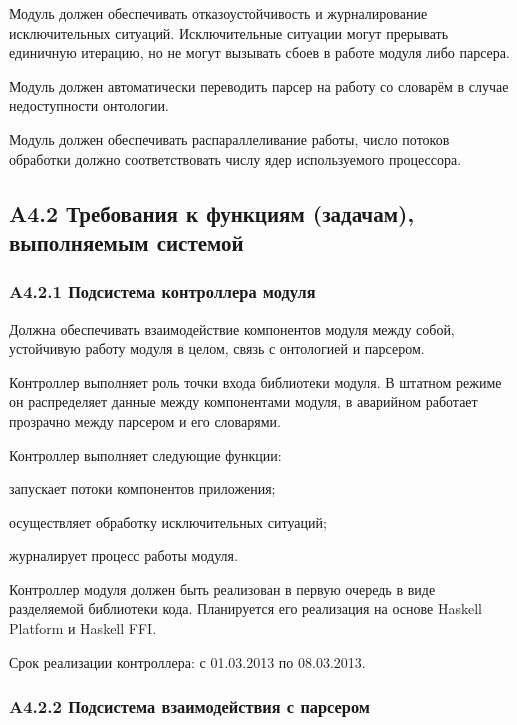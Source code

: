 Модуль должен обеспечивать отказоустойчивость и журналирование исключительных ситуаций. Исключительные ситуации могут прерывать единичную итерацию, но не могут вызывать сбоев в работе модуля либо парсера.

Модуль должен автоматически переводить парсер на работу со словарём в случае недоступности онтологии.

Модуль должен обеспечивать распараллеливание работы, число потоков обработки должно соответствовать числу ядер используемого процессора.

\subsection*{A4.2 Требования к функциям (задачам), выполняемым системой}

\subsubsection*{A4.2.1 Подсистема контроллера модуля}

Должна обеспечивать взаимодействие компонентов модуля между собой, устойчивую
работу модуля в целом, связь с онтологией и парсером.

Контроллер выполняет роль точки входа библиотеки модуля. В штатном режиме он распределяет данные между компонентами модуля, в аварийном работает прозрачно между парсером и его словарями.

Контроллер выполняет следующие функции:
\begin{list}{}{\leftmargin=1.5cm}
  \item запускает потоки компонентов приложения;
  \item осуществляет обработку исключительных ситуаций;
  \item журналирует процесс работы модуля.
\end{list}

Контроллер модуля должен быть реализован в первую очередь в виде разделяемой библиотеки кода. Планируется его реализация на основе Haskell Platform и Haskell FFI.

Срок реализации контроллера: с 01.03.2013 по 08.03.2013.

\subsubsection*{A4.2.2 Подсистема взаимодействия с парсером}

